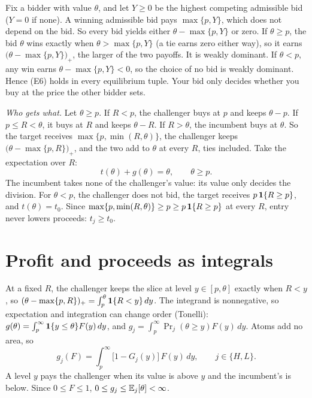 Fix a bidder with value \(\theta\), and let \(Y\ge0\) be the highest competing admissible bid (\(Y=0\) if none).
A winning admissible bid pays \(\max\{p,Y\}\), which does not depend on the bid. So every bid yields either \(\theta-\max\{p,Y\}\) or zero.
If \(\theta\ge p\), the bid \(\theta\) wins exactly when \(\theta>\max\{p,Y\}\) (a tie earns zero either way), so it earns \(\bigl(\theta-\max\{p,Y\}\bigr)_+\), the larger of the two payoffs. It is weakly dominant.
If \(\theta<p\), any win earns \(\theta-\max\{p,Y\}<0\), so the choice of no bid is weakly dominant.
Hence (E6) holds in every equilibrium tuple. Your bid only decides whether you buy at the price the other bidder sets.

\emph{Who gets what.} Let \(\theta\ge p\). If \(R<p\), the challenger buys at \(p\) and keeps \(\theta-p\). If \(p\le R<\theta\), it buys at \(R\) and keeps \(\theta-R\). If \(R>\theta\), the incumbent buys at \(\theta\).
So the target receives \(\max\{p,\min(R,\theta)\}\), the challenger keeps \(\bigl(\theta-\max\{p,R\}\bigr)_+\), and the two add to \(\theta\) at every \(R\), ties included. Take the expectation over \(R\):
\begin{equation}\label{eq:auction-split}
t(\theta)+g(\theta)=\theta,\qquad \theta\ge p.
\end{equation}
The incumbent takes none of the challenger's value: its value only decides the division.
For \(\theta<p\), the challenger does not bid, the target receives \(p\,\mathbf{1}\{R\ge p\}\), and \(t(\theta)=t_0\).
Since \(\max\{p,\min(R,\theta)\}\ge p\ge p\,\mathbf{1}\{R\ge p\}\) at every \(R\), entry never lowers proceeds: \(t_j\ge t_0\).

\section{Profit and proceeds as integrals}\label{sec:auction-spread}

At a fixed \(R\), the challenger keeps the slice at level \(y\in[p,\theta]\) exactly when \(R<y\), so \((\theta-\max\{p,R\})_+=\int_p^\theta\mathbf{1}\{R<y\}\,dy\).
The integrand is nonnegative, so expectation and integration can change order (Tonelli): \(g(\theta)=\int_p^\infty\mathbf{1}\{y\le\theta\}F(y)\,dy\), and \(g_j=\int_p^\infty\Pr_j(\theta\ge y)F(y)\,dy\). Atoms add no area, so
\begin{equation}\label{eq:auction-gross}
g_j(F)=\int_p^\infty\bigl[1-G_j(y)\bigr]\,F(y)\,dy,\qquad j\in\{H,L\}.
\end{equation} A level \(y\) pays the challenger when its value is above \(y\) and the incumbent's is below. Since \(0\le F\le1\), \(0\le g_j\le\mathbb{E}_j[\theta]<\infty\).

